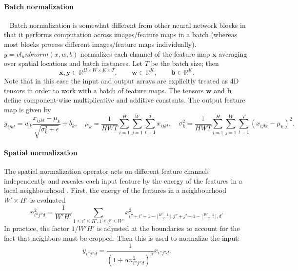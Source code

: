 \paragraph{Batch normalization}\label{s:bnorm}

~\cite{ioffe2015} Batch normalization is somewhat different from other neural network blocks in that it performs computation across images/feature maps in a batch (whereas most blocks process different images/feature maps individually). $y = vl_nnbnorm(x, w, b)$ normalizes each channel of the feature map $\mathbf{x}$ averaging over spatial locations and batch instances. Let $T$ be the batch size; then
\[
\mathbf{x}, \mathbf{y} \in \mathbb{R}^{H \times W \times K \times T},
\qquad\mathbf{w} \in \mathbb{R}^{K},
\qquad\mathbf{b} \in \mathbb{R}^{K}.
\]
Note that in this case the input and output arrays are explicitly treated as 4D tensors in order to work with a batch of feature maps. The tensors  $\mathbf{w}$ and $\mathbf{b}$ define component-wise multiplicative and additive constants. The output feature map is given by
\[
y_{ijkt} = w_k \frac{x_{ijkt} - \mu_{k}}{\sqrt{\sigma_k^2 + \epsilon}} + b_k,
\quad
\mu_{k} = \frac{1}{HWT}\sum_{i=1}^H \sum_{j=1}^W \sum_{t=1}^{T} x_{ijkt},
\quad
\sigma^2_{k} = \frac{1}{HWT}\sum_{i=1}^H \sum_{j=1}^W \sum_{t=1}^{T} (x_{ijkt} - \mu_{k})^2.
\]


\paragraph{Spatial normalization}\label{s:spnorm}

The spatial normalization operator acts on different feature channels independently and rescales each input feature by the energy of the features in a local neighbourhood . First, the energy of the features in a neighbourhood $W'\times H'$ is evaluated
\[
n_{i''j''d}^2 = \frac{1}{W'H'}
\sum_{1\leq i' \leq H', 1 \leq j' \leq W'} x^2_{
	i''+i'-1-\lfloor \frac{H'-1}{2}\rfloor,
	j''+j'-1-\lfloor \frac{W'-1}{2}\rfloor,
	d}.
\]
In practice, the factor $1/W'H'$ is adjusted at the boundaries to account for the fact that neighbors must be cropped. Then this is used to normalize the input:
\[
y_{i''j''d} = \frac{1}{(1 + \alpha n_{i''j''d}^2)^\beta} x_{i''j''d}.
\]


